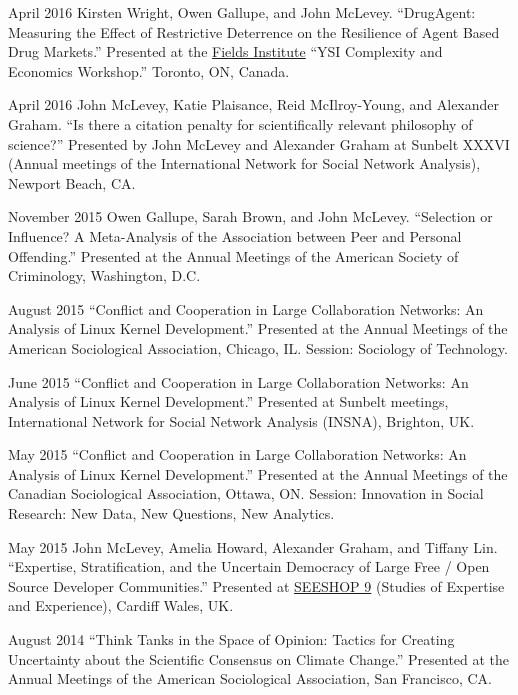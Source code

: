 \ind April 2016 Kirsten Wright, Owen Gallupe, and John McLevey.
``DrugAgent: Measuring the Effect of Restrictive Deterrence on the
Resilience of Agent Based Drug Markets.'' Presented at the
\href{https://www.ineteconomics.org/community/events/complexity-for-new-economic-thinking}{Fields
Institute} ``YSI Complexity and Economics Workshop.'' Toronto, ON,
Canada.

\ind April 2016 John McLevey, Katie Plaisance, Reid McIlroy-Young, and
Alexander Graham. ``Is there a citation penalty for scientifically
relevant philosophy of science?'' Presented by John McLevey and
Alexander Graham at Sunbelt XXXVI (Annual meetings of the International
Network for Social Network Analysis), Newport Beach, CA.

\ind November 2015 Owen Gallupe, Sarah Brown, and John McLevey.
``Selection or Influence? A Meta-Analysis of the Association between
Peer and Personal Offending.'' Presented at the Annual Meetings of the
American Society of Criminology, Washington, D.C.

\ind August 2015 ``Conflict and Cooperation in Large Collaboration
Networks: An Analysis of Linux Kernel Development.'' Presented at the
Annual Meetings of the American Sociological Association, Chicago, IL.
Session: Sociology of Technology.

\ind June 2015 ``Conflict and Cooperation in Large Collaboration
Networks: An Analysis of Linux Kernel Development.'' Presented at
Sunbelt meetings, International Network for Social Network Analysis
(INSNA), Brighton, UK.

\ind May 2015 ``Conflict and Cooperation in Large Collaboration
Networks: An Analysis of Linux Kernel Development.'' Presented at the
Annual Meetings of the Canadian Sociological Association, Ottawa, ON.
Session: Innovation in Social Research: New Data, New Questions, New
Analytics.

\ind May 2015 John McLevey, Amelia Howard, Alexander Graham, and Tiffany
Lin. ``Expertise, Stratification, and the Uncertain Democracy of Large
Free / Open Source Developer Communities.'' Presented at
\href{http://www.cf.ac.uk/socsi/contactsandpeople/harrycollins/expertise-project/seeshophome.html}{SEESHOP
9} (Studies of Expertise and Experience), Cardiff Wales, UK.

\ind August 2014 ``Think Tanks in the Space of Opinion: Tactics for
Creating Uncertainty about the Scientific Consensus on Climate Change.''
Presented at the Annual Meetings of the American Sociological
Association, San Francisco, CA.

